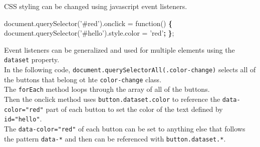 \documentclass[]{book}
\newenvironment{Shaded}{\begin{snugshade}}{\end{snugshade}}
\newcommand{\KeywordTok}[1]{\textcolor[rgb]{0.13,0.29,0.53}{\textbf{#1}}}
\newcommand{\StringTok}[1]{\textcolor[rgb]{0.31,0.60,0.02}{#1}}
\newcommand{\ExtensionTok}[1]{#1}
\newcommand{\NormalTok}[1]{#1}
\begin{document}
CSS styling can be changed using javascript event listeners.

\begin{Shaded}
\begin{Highlighting}[]
\ExtensionTok{document.querySelector}\NormalTok{(}\StringTok{'#red'}\NormalTok{)}\ExtensionTok{.onclick}\NormalTok{ = function() }\KeywordTok{\{}    
    \ExtensionTok{document.querySelector}\NormalTok{(}\StringTok{'#hello'}\NormalTok{)}\ExtensionTok{.style.color}\NormalTok{ = }\StringTok{'red'}\KeywordTok{;}
\KeywordTok{\}}\NormalTok{;                                                       }
\end{Highlighting}
\end{Shaded}

Event listeners can be generalized and used for multiple elements using
the \texttt{dataset} property.\\
In the following code,
\texttt{document.querySelectorAll(\textquotesingle{}.color-change\textquotesingle{})}
selects all of the buttons that belong ot hte \texttt{color-change}
class.\\
The \texttt{forEach} method loops through the array of all of the
buttons.\\
Then the onclick method uses \texttt{button.dataset.color} to reference
the \texttt{data-color="red"} part of each button to set the color of
the text defined by \texttt{id="hello"}.\\
The \texttt{data-color="red"} of each button can be set to anything else
that follows the pattern \texttt{data-*} and then can be referenced with
\texttt{button.dataset.*}.
\end{document}
